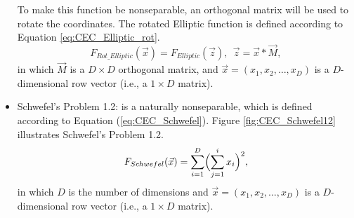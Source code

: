 \begin{itemize}
    To make this function be nonseparable, an orthogonal matrix will be used to rotate the coordinates. The rotated Elliptic function is defined according to Equation \ref{eq:CEC_Elliptic_rot}.
    \begin{equation}\label{eq:CEC_Elliptic_rot}
    F_{Rot\_Elliptic}(\vec{x}) = F_{Elliptic}(\vec{z}),\ \ \vec{z} = \vec{x} \ast \vec{M},
    \end{equation}
    in which $\vec{M}$ is a $D \times D$ orthogonal matrix, and $\vec{x} = (x_1, x_2, \ldots, x_D)$ is a $D$-dimensional row vector (i.e., a $1 \times D$ matrix).

  \item Schwefel's Problem 1.2: is a naturally nonseparable, which is defined according to Equation (\ref{eq:CEC_Schwefel}). Figure \ref{fig:CEC_Schwefel12} illustrates Schwefel's Problem 1.2.
     \begin{equation}\label{eq:CEC_Schwefel}
     F_{Schwefel}(\vec{x}) = \sum_{i=1}^{D}\Bigl(\sum_{j=1}^{i}x_i\Bigr)^2,
     \end{equation}
      in which $D$ is the number of dimensions and $\vec{x} = (x_1, x_2, \ldots, x_D)$ is a $D$-dimensional row vector (i.e., a $1 \times D$ matrix).
     \begin{figure}[!h]
     \centering
     \hspace{1mm}

\end{figure}
\end{itemize}
